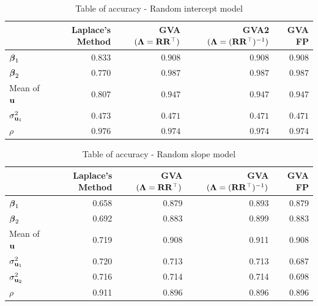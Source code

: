 \documentclass{article}[12pt]
\begin{document}
\begin{table}
\caption{Table of accuracy - Random intercept model}
\label{tab:accuracy_int}
\begin{tabular}{|l|rrrr|}
\hline
& Laplace's Method & GVA $({\boldsymbol \Lambda} = {\bf R} {\bf R}^\top)$ & GVA2 $({\boldsymbol \Lambda} = ({\bf R} {\bf R}^\top)^{-1})$ & GVA FP\\
\hline
${\boldsymbol \beta}_1$ & $0.833$ & $0.908$ & $0.908$ & $0.908$ \\ 
${\boldsymbol \beta}_2$ & $0.770$ & $0.987$ & $0.987$ & $0.987$ \\ 
Mean of ${\bf u}$ & $0.807$ & $0.947$ & $0.947$ & $0.947$ \\
$\sigma^2_{{\bf u}_1}$ & $0.473$ & $0.471$ & $0.471$ & $0.471$ \\ 
$\rho$ & $0.976$ & $0.974$ & $0.974$ &  $0.974$ \\ 
\hline
\end{tabular}
\end{table}

\begin{table}
\caption{Table of accuracy - Random slope model}
\label{tab:accuracy_slope}
\begin{tabular}{|l|rrrr|}
\hline
& Laplace's Method & GVA $({\boldsymbol \Lambda} = {\bf R} {\bf R}^\top)$ & GVA $({\boldsymbol \Lambda} = ({\bf R} {\bf R}^\top)^{-1})$ & GVA FP\\
\hline
${\boldsymbol \beta}_1$     &0.658&0.879&0.893&0.879\\
${\boldsymbol \beta}_2$     &0.692&0.883&0.899&0.883\\
Mean of ${\bf u}$        &0.719&0.908&0.911&0.908\\
$\sigma^2_{{\bf u}_1}$ &0.720&0.713&0.713&0.687\\
$\sigma^2_{{\bf u}_2}$ &0.716&0.714&0.714&0.698\\
$\rho$ &0.911&0.896&0.896&0.896\\
\hline
\end{tabular}
\end{table}

\end{document}
